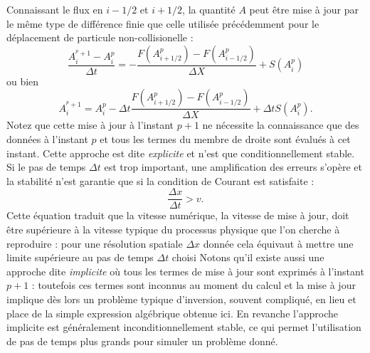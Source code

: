  Connaissant le flux en $i-1/2$ et $i+1/2$, la quantité $A$ peut être mise à jour par le même type de différence finie que celle utilisée précédemment pour le déplacement de particule non-collisionelle :
 \begin{equation}
 \frac{A_i^{^p+1}-A_i^p}{\Delta t}=-\frac{F(A_{i+1/2}^p)-F(A_{i-1/2}^p)}{\Delta X}+S(A_i^p)
 \end{equation}
 ou bien
 \begin{equation}
 A_i^{^p+1}=A_i^p-\Delta t \frac{F(A_{i+1/2}^p)-F(A_{i-1/2}^p)}{\Delta X}+\Delta t S(A_i^p).
 \end{equation}
Notez que cette mise à jour à l'instant $p+1$ ne nécessite la connaissance que des données à l'instant $p$ et tous les termes du membre de droite sont évalués à cet instant. Cette approche est dite \textit{explicite} et n'est que conditionnellement stable. Si le pas de temps $\Delta t$ est trop important, une amplification des erreurs s'opère et la stabilité n'est garantie que si la condition de Courant est satisfaite :
\begin{equation}
\frac{\Delta x}{ \Delta t}> v.
\end{equation}
Cette équation traduit que la vitesse numérique, la vitesse de mise à jour, doit être supérieure à la vitesse typique du processus physique que l'on cherche à reproduire : pour une résolution spatiale $\Delta x$ donnée cela équivaut à mettre une limite supérieure au pas de temps $\Delta t$ choisi  Notons qu'il existe aussi une approche dite \textit{implicite} où tous les termes de mise à jour sont exprimés à l'instant $p+1$ : toutefois ces termes sont inconnus au moment du calcul et la mise à jour implique dès lors un problème typique d'inversion, souvent compliqué, en lieu et place de la simple expression algébrique obtenue ici. En revanche l'approche implicite est généralement inconditionnellement stable, ce qui permet l'utilisation de pas de temps plus grands pour simuler un problème donné.

